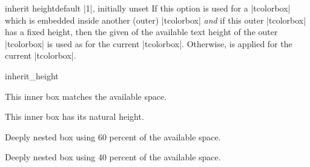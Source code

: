 \clearpage
\begin{docTcbKey}[][doc new={2017-06-28}]{inherit height}{}{default |1|, initially unset}
  If this option is used for a |tcolorbox| which is embedded inside
  another (outer) |tcolorbox| \emph{and} if this outer |tcolorbox| has
  a fixed height, then the given  of the available text height
  of the outer |tcolorbox| is used as  for the current
  |tcolorbox|.
  Otherwise,  is applied for the current
  |tcolorbox|.

\begin{exdispExample}{inherit_height}

\begin{tcolorbox}[title=Outer box with fixed height 3.5cm,height=3.5cm]
  \begin{tcolorbox}[title=Inner box,nobeforeafter,inherit height]
    This inner box matches the available space.
  \end{tcolorbox}
\end{tcolorbox}

\begin{tcolorbox}[title=Outer box with natural height]
  \begin{tcolorbox}[title=Inner box,nobeforeafter,inherit height]
    This inner box has its natural height.
  \end{tcolorbox}
\end{tcolorbox}

\begin{tcolorbox}[title=Outer box with fixed height 5cm,height=5cm]
  \begin{tcolorbox}[title=Inner box,nobeforeafter,inherit height]
    \begin{tcolorbox}[colframe=red,beforeafter skip=0pt,inherit height=0.6]
      Deeply nested box using 60 percent of the available space.
    \end{tcolorbox}
    \begin{tcolorbox}[colframe=red,beforeafter skip=0pt,inherit height=0.4]
      Deeply nested box using 40 percent of the available space.
    \end{tcolorbox}
  \end{tcolorbox}
\end{tcolorbox}
\end{exdispExample}
\end{docTcbKey}


\clearpage

